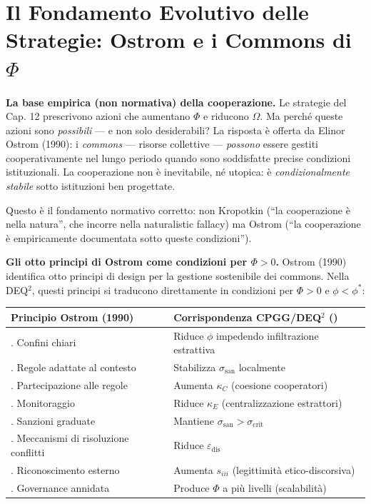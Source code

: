 \section{Il Fondamento Evolutivo delle Strategie: Ostrom e i Commons di
\(\Phi\)}\label{il-fondamento-evolutivo-delle-strategie}

\Proved{} \textbf{La base empirica (non normativa) della cooperazione.}
Le strategie del Cap. 12 prescrivono azioni che aumentano $\Phi$ e
riducono $\Omega$. Ma perché queste azioni sono \emph{possibili} --- e non
solo desiderabili? La risposta è offerta da Elinor Ostrom (1990): i
\emph{commons} --- risorse collettive --- \emph{possono} essere gestiti
cooperativamente nel lungo periodo quando sono soddisfatte precise
condizioni istituzionali. La cooperazione non è inevitabile, né utopica:
è \emph{condizionalmente stabile} sotto istituzioni ben progettate.

Questo è il fondamento normativo corretto: non Kropotkin (``la
cooperazione è nella natura'', che incorre nella naturalistic fallacy) ma
Ostrom (``la cooperazione è empiricamente documentata sotto queste
condizioni'').

\Hypoth{} \textbf{Gli otto principi di Ostrom come condizioni per
\(\Phi > 0\).} Ostrom (1990) identifica otto principi di design per la
gestione sostenibile dei commons. Nella DEQ$^2$, questi principi si
traducono direttamente in condizioni per $\Phi > 0$ e $\phi < \phi^*$:

{\def\LTcaptype{none}
{\small\begin{longtable}[]{@{}
  >{\raggedright\arraybackslash}p{}
  >{\raggedright\arraybackslash}p{}@{}}
\toprule\noalign{}
\begin{minipage}[b]{\linewidth}\raggedright
Principio Ostrom (1990)
\end{minipage} & \begin{minipage}[b]{\linewidth}\raggedright
Corrispondenza CPGG/DEQ$^2$ (\Hypoth{})
\end{minipage} \\
\midrule\noalign{}
\endhead
\bottomrule\noalign{}
\endlastfoot
1. Confini chiari & Riduce $\phi$ impedendo infiltrazione estrattiva \\
2. Regole adattate al contesto & Stabilizza $\sigma_{\text{san}}$ localmente \\
3. Partecipazione alle regole & Aumenta $\kappa_C$ (coesione cooperatori) \\
4. Monitoraggio & Riduce $\kappa_E$ (centralizzazione estrattori) \\
5. Sanzioni graduate & Mantiene $\sigma_{\text{san}} > \sigma_{\text{crit}}$ \\
6. Meccanismi di risoluzione conflitti & Riduce $\varepsilon_{\text{dis}}$ \\
7. Riconoscimento esterno & Aumenta $s_{iii}$ (legittimità etico-discorsiva) \\
8. Governance annidata & Produce $\Phi$ a più livelli (scalabilità) \\
\end{longtable}}
}

